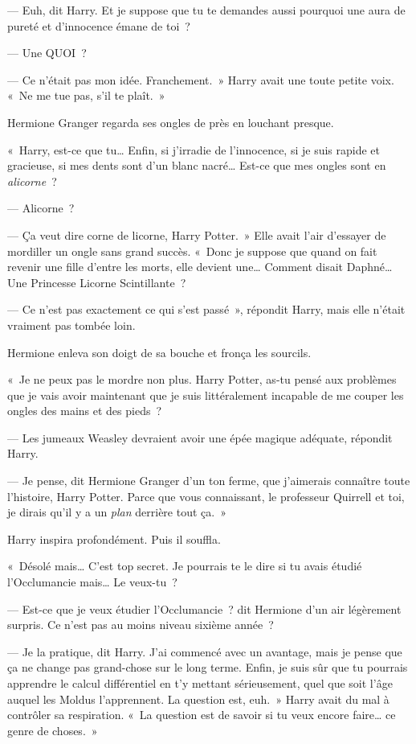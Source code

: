 --- Euh, dit Harry.
Et je suppose que tu te demandes aussi pourquoi une aura de pureté et d'innocence émane de toi~?

--- Une QUOI~?

--- Ce n'était pas mon idée.
Franchement.~»
Harry avait une toute petite voix.
«~Ne me tue pas, s'il te plaît.~»

Hermione Granger regarda ses ongles de près en louchant presque.

«~Harry, est-ce que tu…
Enfin, si j'irradie de l'innocence, si je suis rapide et gracieuse, si mes dents sont d'un blanc nacré…
Est-ce que mes ongles sont en \emph{alicorne}~?

--- Alicorne~?

--- Ça veut dire corne de licorne, Harry Potter.~»
Elle avait l'air d'essayer de mordiller un ongle sans grand succès.
«~Donc je suppose que quand on fait revenir une fille d'entre les morts, elle devient une…
Comment disait Daphné…
Une Princesse Licorne Scintillante~?

--- Ce n'est pas exactement ce qui s'est passé~», répondit Harry, mais elle n'était vraiment pas tombée loin.

Hermione enleva son doigt de sa bouche et fronça les sourcils.

«~Je ne peux pas le mordre non plus.
Harry Potter, as-tu pensé aux problèmes que je vais avoir maintenant que je suis littéralement incapable de me couper les ongles des mains et des pieds~?

--- Les jumeaux Weasley devraient avoir une épée magique adéquate, répondit Harry.

--- Je pense, dit Hermione Granger d'un ton ferme, que j'aimerais connaître toute l'histoire, Harry Potter.
Parce que vous connaissant, le professeur Quirrell et toi, je dirais qu'il y a un \emph{plan} derrière tout ça.~»

Harry inspira profondément.
Puis il souffla.

«~Désolé mais…
C'est top secret.
Je pourrais te le dire si tu avais étudié l'Occlumancie mais…
Le veux-tu~?

--- Est-ce que je veux étudier l'Occlumancie~? dit Hermione d'un air légèrement surpris.
Ce n'est pas au moins niveau sixième année~?

--- Je la pratique, dit Harry.
J'ai commencé avec un avantage, mais je pense que ça ne change pas grand-chose sur le long terme.
Enfin, je suis sûr que tu pourrais apprendre le calcul différentiel en t'y mettant sérieusement, quel que soit l'âge auquel les Moldus l'apprennent.
La question est, euh.~»
Harry avait du mal à contrôler sa respiration.
«~La question est de savoir si tu veux encore faire… ce genre de choses.~»

